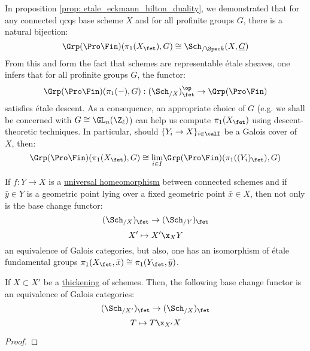 \begin{remark} \label{remark: the_etale_fundamental_group_satisfies_descent}
            In proposition \ref{prop: etale_eckmann_hilton_duality}, we demonstrated that for any connected qcqs base scheme $X$ and for all profinite groups $G$, there is a natural bijection:
                $$\Grp(\Pro\Fin)(\pi_1(X_{\fet}), G) \cong \Sch_{/\Spec k}(X, \underline{G})$$
            From this and form the fact that schemes are representable \'etale sheaves, one infers that for all profinite groups $G$, the functor:
                $$\Grp(\Pro\Fin)(\pi_1(-), G): (\Sch_{/X})_{\fet}^{\op} \to \Grp(\Pro\Fin)$$
            satisfies \'etale descent. As a consequence, an appropriate choice of $G$ (e.g. we shall be concerned with $G \cong \GL_n(\Z_{\ell})$) can help us compute $\pi_1(X_{\fet})$ using descent-theoretic techniques. In particular, should $\{Y_i \to X\}_{i \in \calI}$ be a Galois cover of $X$, then:
                $$\Grp(\Pro\Fin)(\pi_1(X_{\fet}), G) \cong \underset{i \in I}{\lim} \Grp(\Pro\Fin)(\pi_1((Y_i)_{\fet}), G)$$
        \end{remark}
        
        If $f: Y \to X$ is a \href{https://stacks.math.columbia.edu/tag/04DC}{\underline{universal homeomorphism}} between connected schemes and if $\bar{y} \in Y$ is a geometric point lying over a fixed geometric point $\bar{x} \in X$, then not only is the base change functor:
                    $$(\Sch_{/X})_{\fet} \to (\Sch_{/Y})_{\fet}$$
                    $$X' \mapsto X' \x_X Y$$
                an equivalence of Galois categories, but also, one has an isomorphism of \'etale fundamental groups $\pi_1(X_{\fet}, \bar{x}) \cong \pi_1(Y_{\fet}, \bar{y})$. 
                
        \begin{lemma} \label{lemma: base_change_of_thickenings}
            If $X \subset X'$ be a \href{https://stacks.math.columbia.edu/tag/04EW}{\underline{thickening}} of schemes. Then, the following base change functor is an equivalence of Galois categories:
                $$(\Sch_{/X'})_{\fet} \to (\Sch_{/X})_{\fet}$$
                $$T \mapsto T \x_{X'} X$$
        \end{lemma}
            \begin{proof}
                
            \end{proof}